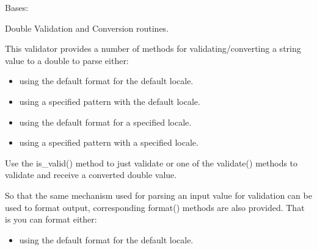 \documentclass[letterpaper,10pt,english]{sphinxmanual}
\begin{document}
\begin{fulllineitems}
\label{\detokenize{apache_commons_validator_python.routines:apache_commons_validator_python.routines.double_validator.DoubleValidator}}
\pysigstartsignatures
{}
\pysigstopsignatures
\sphinxAtStartPar
Bases: {\hyperref[\detokenize{apache_commons_validator_python.routines:apache_commons_validator_python.routines.abstract_number_validator.AbstractNumberValidator}]{}}

\sphinxAtStartPar
Double Validation and Conversion routines.

\sphinxAtStartPar
This validator provides a number of methods for validating/converting a string value
to a double to parse either:
\begin{itemize}
\item {} 
\sphinxAtStartPar
using the default format for the default locale.

\item {} 
\sphinxAtStartPar
using a specified pattern with the default locale.

\item {} 
\sphinxAtStartPar
using the default format for a specified locale.

\item {} 
\sphinxAtStartPar
using a specified pattern with a specified locale.

\end{itemize}

\sphinxAtStartPar
Use the is\_valid() method to just validate or one of the validate() methods to
validate and receive a converted double value.

\sphinxAtStartPar
So that the same mechanism used for parsing an input value for validation can be used to format output,
corresponding format() methods are also provided. That is you can format either:
\begin{itemize}
\item {} 
\sphinxAtStartPar
using the default format for the default locale.


\end{itemize}
\end{fulllineitems}
\end{document}
